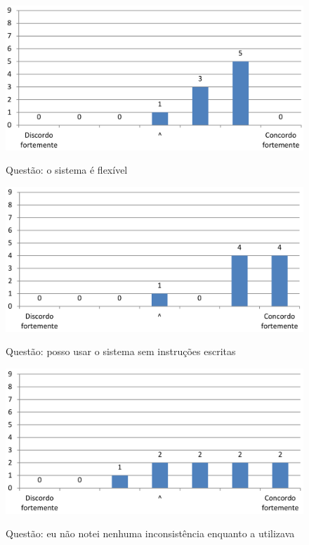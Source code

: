 \begin{figure}[h]
\centering
\caption{Questão: o sistema é flexível}
\includegraphics[width=1.0\textwidth]{use/fu_flexivel.pdf} 
\label{fig:fu_flexivel} 
\end{figure}


\begin{figure}[h]
\centering
\caption{Questão: posso usar o sistema sem instruções escritas}
\includegraphics[width=1.0\textwidth]{use/fu_sem_instrucoes.pdf} 
\label{fig:fu_sem_instrucoes} 
\end{figure}


\begin{figure}[h]
\centering
\caption{Questão: eu não notei nenhuma inconsistência enquanto a utilizava}
\includegraphics[width=1.0\textwidth]{use/fu_inconsistencia.pdf} 
\label{fig:fu_inconsistencia} 
\end{figure}


